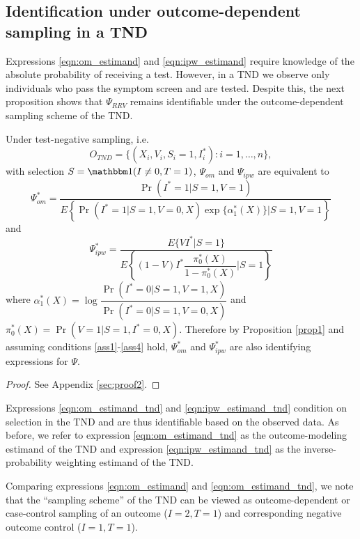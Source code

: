 \documentclass[11pt]{article}
\begin{document}
\subsection{Identification under outcome-dependent sampling in a TND}

Expressions \ref{eqn:om_estimand} and \ref{eqn:ipw_estimand} require knowledge of the absolute probability of receiving a test. However, in a TND we observe only individuals who pass the symptom screen and are tested. Despite this, the next proposition shows that $\Psi_{RRV}$ remains identifiable under the outcome-dependent sampling scheme of the TND. 
 \begin{proposition}\label{prop2}
      Under test-negative sampling, i.e. 
      $$O_{TND} = \{(X_i, V_i, S_i=1, I^*_i) : i = 1, \ldots, n\},$$ 
      with selection $S = \mathbbm 1(I\neq 0, T = 1)$, $\Psi_{om}$ and $\Psi_{ipw}$ are equivalent to 
    \begin{equation}\label{eqn:om_estimand_tnd}
        \Psi_{om}^* = \dfrac{\Pr(I^* = 1 | S = 1, V = 1)}{E\left\{  \Pr(I^* = 1 | S = 1, V = 0, X) \exp\{\alpha^*_1(X)\}\Big| S = 1, V = 1 \right\}}
    \end{equation}
    and 
    \begin{equation}\label{eqn:ipw_estimand_tnd}
        \Psi_{ipw}^* = \dfrac{E\{VI^*|S =1\}}{E\left\{ (1 - V) I^* \dfrac{\pi^*_0(X)}{1 - \pi^*_0(X)} \bigg| S = 1\right\}}
    \end{equation}
    where $\alpha^*_1(X) = \log \dfrac{\Pr(I^* = 0 | S = 1, V = 1, X)}{\Pr(I^* = 0| S = 1, V = 0, X)}$ and $\pi^*_0(X) = \Pr(V = 1| S = 1, I^* = 0, X)$. Therefore by Proposition \ref{prop1} and assuming conditions \ref{ass1}-\ref{ass4} hold, $\Psi_{om}^*$ and $\Psi_{ipw}^*$ are also identifying expressions for $\Psi$.
 \end{proposition}
 \begin{proof}
    See Appendix \ref{sec:proof2}.
 \end{proof}
    
 Expressions \ref{eqn:om_estimand_tnd} and  \ref{eqn:ipw_estimand_tnd} condition on selection in the TND and are thus identifiable based on the observed data. As before, we refer to expression \ref{eqn:om_estimand_tnd} as the outcome-modeling estimand of the TND and expression \ref{eqn:ipw_estimand_tnd} as the inverse-probability weighting estimand of the TND.

 \begin{remark}
     Comparing expressions \ref{eqn:om_estimand} and \ref{eqn:om_estimand_tnd}, we note that the ``sampling scheme'' of the TND can be viewed as outcome-dependent or case-control sampling of an outcome ($I=2, T=1$) and corresponding negative outcome control ($I=1, T =1$). 
 \end{remark}
\end{document}
